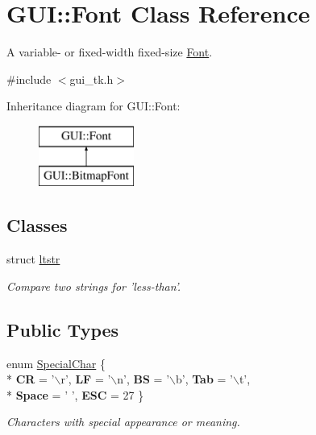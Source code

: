 \hypertarget{classGUI_1_1Font}{\section{G\-U\-I\-:\-:Font Class Reference}
\label{classGUI_1_1Font}
}


A variable-\/ or fixed-\/width fixed-\/size \hyperlink{classGUI_1_1Font}{Font}.  




{\ttfamily \#include $<$gui\-\_\-tk.\-h$>$}

Inheritance diagram for G\-U\-I\-:\-:Font\-:\begin{figure}[H]
\begin{center}
\leavevmode
\includegraphics[height=2.000000cm]{classGUI_1_1Font}
\end{center}
\end{figure}
\subsection*{Classes}
\begin{DoxyCompactItemize}
\item 
struct \hyperlink{structGUI_1_1Font_1_1ltstr}{ltstr}
\begin{DoxyCompactList}\small\item\em Compare two strings for 'less-\/than'. \end{DoxyCompactList}\end{DoxyCompactItemize}
\subsection*{Public Types}
\begin{DoxyCompactItemize}
\item 
enum \hyperlink{classGUI_1_1Font_af3c234cd3febe27dbe9c76e6cc5cad3a}{Special\-Char} \{ \\*
{\bfseries C\-R} =  '$\backslash$r', 
{\bfseries L\-F} =  '$\backslash$n', 
{\bfseries B\-S} =  '$\backslash$b', 
{\bfseries Tab} =  '$\backslash$t', 
\\*
{\bfseries Space} =  ' ', 
{\bfseries E\-S\-C} =  27
 \}
\begin{DoxyCompactList}\small\item\em Characters with special appearance or meaning. \end{DoxyCompactList}\end{DoxyCompactItemize}
